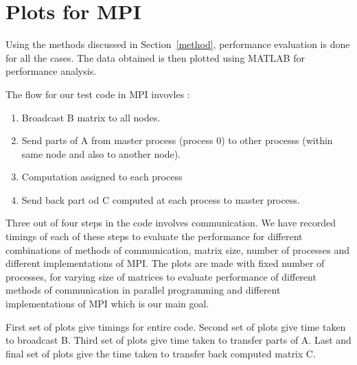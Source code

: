 \documentclass[10pt]{article}
\begin{document}
\section{Plots for MPI}
Using the methods discussed in Section~\ref{method}, performance evaluation is done for all the cases. The data obtained is then plotted using MATLAB for performance analysis.

The flow for our test code in MPI invovles : 
\begin{enumerate}
\item Broadcast B matrix to all nodes.
\item Send parts of A from master process (process 0) to other processs (within same node and also to another node).
\item Computation assigned to each process
\item Send back part od C computed at each process to master process.
\end{enumerate}
Three out of four steps in the code involves communication. We have recorded timings of each of these steps to evaluate the performance for different combinations of methods of communication, matrix size, number of processes and different implementations of MPI.
The plots are made with fixed number of processes, for varying size of matrices to evaluate performance of different methods of communication in parallel programming and different implementations of MPI which is our main goal.

First set of plots give timings for entire code. Second set of plots give time taken to broadcast B. Third set of plots give time taken to transfer parts of A. Last and final set of plots give the time taken to transfer back computed matrix C.
\end{document}

